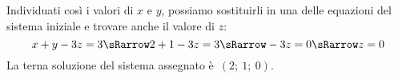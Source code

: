 \begin{esempio}
Individuati così i valori di \(x\) e \(y\), possiamo sostituirli in una delle 
equazioni del sistema iniziale e trovare anche il valore di \(z\):
\[x+y-3z=3 \sRarrow 2+1-3z=3 \sRarrow -3z=0 \sRarrow z=0\]
La terna soluzione del sistema assegnato è~\((2;~1;~0)\).
 \end{esempio}

% 
% 
% 
% 
% 
% 
% 
% 

